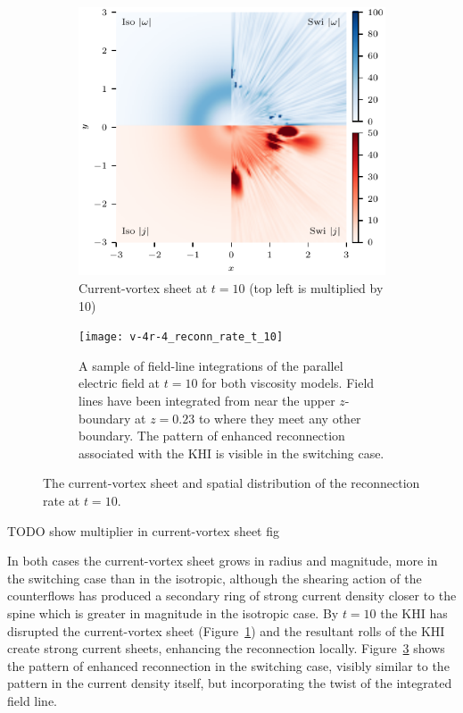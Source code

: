 \begin{figure}[t]
  \centering
    \begin{subfigure}{0.48\textwidth}
      \includegraphics[width=\linewidth]{v-4r-4_vorticity_current_ring_t_10}
      \caption{Current-vortex sheet at $t=10$ (top left is multiplied by 10)}
      \label{fig:v-4r-4_vorticity_current_ring_t_10}
    \end{subfigure}
    \hfill
    \begin{subfigure}{0.48\textwidth}
      \texttt{[image: v-4r-4\_reconn\_rate\_t\_10]}
      \caption{A sample of field-line integrations of the parallel electric field at $t=10$ for both viscosity models. Field lines have been integrated from near the upper $z$-boundary at $z=0.23$ to where they meet any other boundary. The pattern of enhanced reconnection associated with the KHI is visible in the switching case.}
      \label{fig:v-4r-4_reconn_rate_t_10}
    \end{subfigure}
\caption{The current-vortex sheet and spatial distribution of the reconnection rate at $t=10$.}
\end{figure}

TODO show multiplier in current-vortex sheet fig

In both cases the current-vortex sheet grows in radius and magnitude, more in the switching case than in the isotropic, although the shearing action of the counterflows has produced a secondary ring of strong current density closer to the spine which is greater in magnitude in the isotropic case. By $t=10$ the KHI has disrupted the current-vortex sheet (Figure~\ref{fig:v-4r-4_vorticity_current_ring_t_10}) and the resultant rolls of the KHI create strong current sheets, enhancing the reconnection locally. Figure~\ref{fig:v-4r-4_reconn_rate_t_10} shows the pattern of enhanced reconnection in the switching case, visibly similar to the pattern in the current density itself, but incorporating the twist of the integrated field line.

